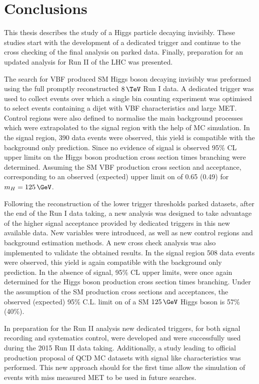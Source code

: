 \chapter{Conclusions}
\label{CHAPTER:Conclusions}


This thesis describes the study of a Higgs particle decaying invisibly. These studies start with the development of a dedicated trigger and continue to the cross checking of the final analysis on parked data. Finally, preparation for an updated analysis for Run II of the \gls{LHC} was presented.

The search for \gls{VBF} produced \gls{SM} Higgs boson decaying invisibly was preformed using the full promptly reconstructed $8\,\TeV$ Run I data. A dedicated trigger was used to collect events over which a single bin counting experiment was optimised to select events containing a dijet with \gls{VBF} characteristics and large \gls{MET}. Control regions were also defined to normalise the main background processes which were extrapolated to the signal region with the help of \gls{MC} simulation. In the signal region, 390 data events were observed, this yield is compatible with the background only prediction. Since no evidence of signal is observed 95\% \gls{CL} upper limits on the Higgs boson production cross section times branching were determined. Assuming the \gls{SM} \gls{VBF} production cross section and acceptance, corresponding to an observed (expected) upper limit on \BRinv of 0.65 (0.49) for $m_H=125\,\GeV$.

Following the reconstruction of the lower trigger thresholds parked datasets, after the end of the Run I data taking, a new analysis was designed to take advantage of the higher signal acceptance provided by dedicated triggers in this new available data. New variables were introduced, as well as new control regions and background estimation methods. A new cross check analysis was also implemented to validate the obtained results. In the signal region 508 data events were observed, this yield is again compatible with the background only prediction. In the absence of signal, 95\% \gls{CL} upper limits, were once again determined for the Higgs boson production cross section times branching. Under the assumption of the \gls{SM} production cross sections and acceptances, the observed (expected) 95\% C.L. limit on \BRinv of a \gls{SM} $125\,\GeV$ Higgs boson is 57\% (40\%).

In preparation for the Run II analysis new dedicated triggers, for both signal recording and systematics control, were developed and were successfully used during the 2015 Run II data taking. Additionally, a study leading to official production proposal of \gls{QCD} \gls{MC} datasets with signal like characteristics was performed. This new approach should for the first time allow the simulation of events with miss measured \gls{MET} to be used in future searches.


